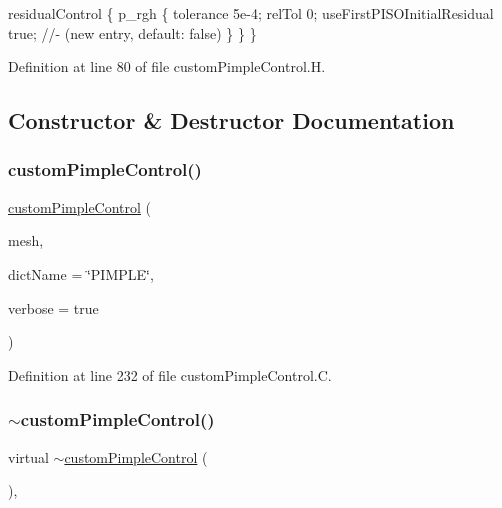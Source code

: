 residual\+Control \{ p\+\_\+rgh \{ tolerance 5e-\/4; rel\+Tol 0; use\+First\+P\+I\+S\+O\+Initial\+Residual true; //-\/ (new entry, default\+: false) \} \} \} 

Definition at line 80 of file custom\+Pimple\+Control.\+H.



\subsection{Constructor \& Destructor Documentation}
\mbox{\label{classFoam_1_1customPimpleControl_a7bbdf61c5ddf2a79f9c01202bbd4796d}} 
\subsubsection{\texorpdfstring{custom\+Pimple\+Control()}{customPimpleControl()}}
{\footnotesize\ttfamily \hyperlink{classFoam_1_1customPimpleControl}{custom\+Pimple\+Control} (\begin{DoxyParamCaption}\item[{fv\+Mesh \&}]{mesh,  }\item[{const word \&}]{dict\+Name = {\ttfamily \char`\"{}PIMPLE\char`\"{}},  }\item[{const bool}]{verbose = {\ttfamily true} }\end{DoxyParamCaption})}



Definition at line 232 of file custom\+Pimple\+Control.\+C.

\mbox{\label{classFoam_1_1customPimpleControl_a72d00660956037b3d35bae4bdffa07f2}} 
\subsubsection{\texorpdfstring{$\sim$custom\+Pimple\+Control()}{~customPimpleControl()}}
{\footnotesize\ttfamily virtual $\sim$\hyperlink{classFoam_1_1customPimpleControl}{custom\+Pimple\+Control} (\begin{DoxyParamCaption}{ }\end{DoxyParamCaption})\hspace{0.3cm}{\ttfamily [virtual]}, {\ttfamily [default]}}



